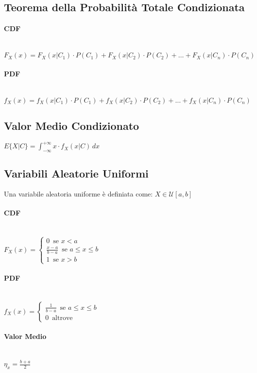 \documentclass{article}
\begin{document}
\subsection{Teorema della Probabilità Totale Condizionata}

\paragraph{CDF} ~\\
$F_X(x) = F_X(x|C_1) \cdot P(C_1) + F_X(x|C_2) \cdot P(C_2) + \dots + F_X(x|C_n) \cdot P(C_n)$

\paragraph{PDF} ~\\
$f_X(x) = f_X(x|C_1) \cdot P(C_1) + f_X(x|C_2) \cdot P(C_2) + \dots + f_X(x|C_n) \cdot P(C_n)$

\subsection{Valor Medio Condizionato}
$E \big\{ X | C \big\} = \int_{-\infty}^{+\infty} x \cdot f_X(x|C) \,dx$

\subsection{Variabili Aleatorie Uniformi}
Una variabile aleatoria uniforme è definiata come: $X \in \mathcal{U}[a,b]$ 
\paragraph{CDF} ~\\
$F_X(x) = \begin{cases}
0 \,\text{ se } x < a \\
\frac{x-a}{b-a} \,\text{ se } a \leq x \leq b \\
1 \,\text{ se } x>b
\end{cases}$
\paragraph{PDF} ~\\
$f_X(x) = \begin{cases}
\frac{1}{b-a} \,\text{ se } a \leq x \leq b \\
0 \,\text{ altrove}
\end{cases}$
\paragraph{Valor Medio} ~\\
$\eta_x = \frac{b+a}{2}$
\end{document}
